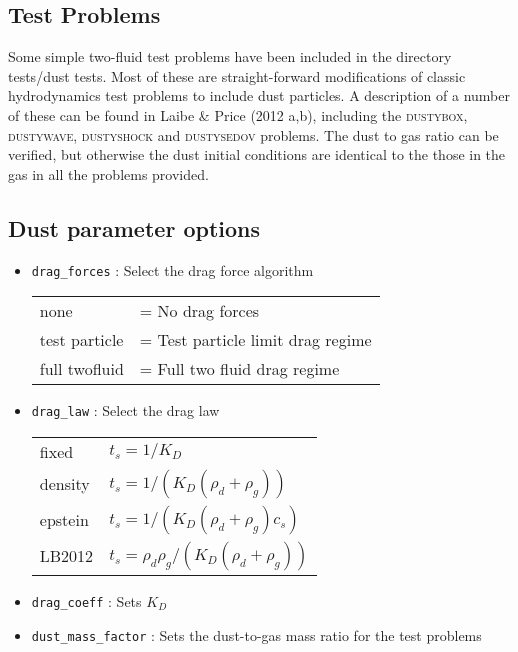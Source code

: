 \documentclass[a4paper]{article}
\newcommand{\var}[1]{\texttt{#1}}
\begin{document}
\subsection{Test Problems}
Some simple two-fluid test problems have been included in the directory tests/dust tests. Most of these are straight-forward modifications of classic hydrodynamics test problems to include dust particles. A description of a number of these can be found in Laibe \& Price (2012 a,b), including the \textsc{dustybox}, \textsc{dustywave}, \textsc{dustyshock} and \textsc{dustysedov} problems. The dust to gas ratio can be verified, but otherwise the dust initial conditions are identical to the those in the gas in all the problems provided.

\subsection{Dust parameter options}
\begin{itemize}

\item \var{drag\_forces} : Select the drag force algorithm

\begin{tabular}{ll}
none              & = No drag forces \\
test particle     & = Test particle limit drag regime \\
full twofluid     & = Full two fluid drag regime
\end{tabular}

\item \var{drag\_law} : Select the drag law

\begin{tabular}{ll}
fixed             & $t_s = 1 / K_D$ \\
density           & $t_s = 1 / (K_D(\rho_d + \rho_g))$ \\
epstein           & $t_s = 1 / (K_D(\rho_d + \rho_g)c_s)$ \\
LB2012            & $t_s = \rho_d \rho_g / (K_D(\rho_d + \rho_g))$ \\
\end{tabular}

\item \var{drag\_coeff} : Sets $K_D$

\item \var{dust\_mass\_factor} : Sets the dust-to-gas mass ratio for the test problems

\end{itemize}
\end{document}
